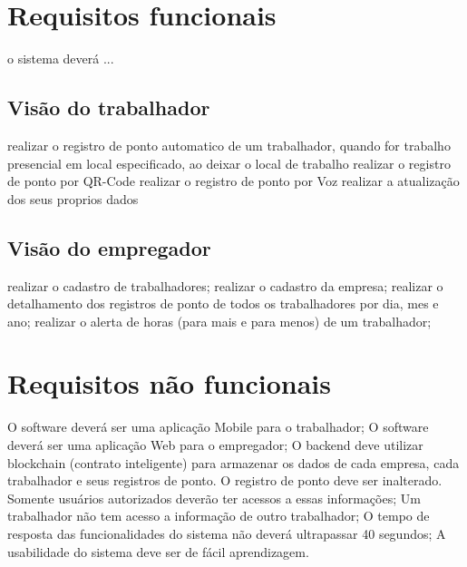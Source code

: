 \documentclass[12pt,openright,twoside,a4paper,english, brazil]{abntex2} %
\begin{document}



\section{Requisitos funcionais}

o sistema deverá ...


\subsection{Visão do trabalhador}

realizar o registro de ponto automatico de um trabalhador, quando for trabalho presencial em local especificado, ao deixar o local de trabalho
realizar o registro de ponto por QR-Code
realizar o registro de ponto por Voz
realizar a atualização dos seus proprios dados

\subsection{Visão do empregador}

realizar o cadastro de trabalhadores;
realizar o cadastro da empresa;
realizar o detalhamento dos registros de ponto de todos os trabalhadores por dia, mes e ano;
realizar o alerta de horas (para mais e para menos) de um trabalhador;


\section{Requisitos não funcionais}

O software deverá ser uma aplicação Mobile para o trabalhador;
O software deverá ser uma aplicação Web para o empregador;
O backend deve utilizar blockchain (contrato inteligente) para armazenar os dados de cada empresa, cada trabalhador e seus registros de ponto.
O registro de ponto deve ser inalterado.
Somente usuários autorizados deverão ter acessos a essas informações;
Um trabalhador não tem acesso a informação de outro trabalhador;
O tempo de resposta das funcionalidades do sistema não deverá ultrapassar 40 segundos;
A usabilidade do sistema deve ser de fácil aprendizagem.
\end{document}
